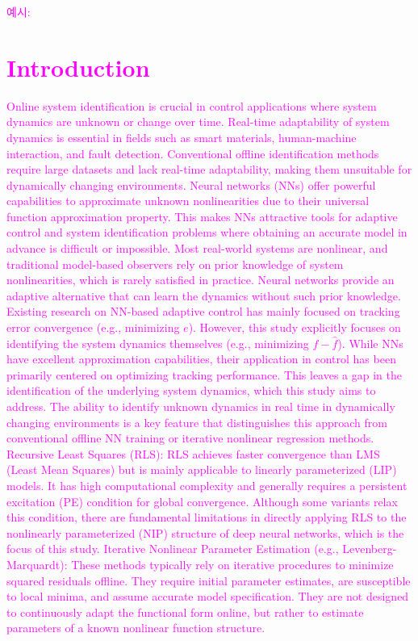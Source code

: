 \documentclass[10pt,twocolumn]{ICCAS}
\newcommand{\DHHO}[1]{\textcolor{magenta}{#1}}
\begin{document}
\DHHO{예시:
    \section{Introduction}
    Online system identification is crucial in control applications where system dynamics are unknown or change over time. Real-time adaptability of system dynamics is essential in fields such as smart materials, human-machine interaction, and fault detection. Conventional offline identification methods require large datasets and lack real-time adaptability, making them unsuitable for dynamically changing environments.
    Neural networks (NNs) offer powerful capabilities to approximate unknown nonlinearities due to their universal function approximation property. This makes NNs attractive tools for adaptive control and system identification problems where obtaining an accurate model in advance is difficult or impossible.
    Most real-world systems are nonlinear, and traditional model-based observers rely on prior knowledge of system nonlinearities, which is rarely satisfied in practice. Neural networks provide an adaptive alternative that can learn the dynamics without such prior knowledge.
    Existing research on NN-based adaptive control has mainly focused on tracking error convergence (e.g., minimizing $e$). However, this study explicitly focuses on identifying the system dynamics themselves (e.g., minimizing $f - \hat{f}$). While NNs have excellent approximation capabilities, their application in control has been primarily centered on optimizing tracking performance. This leaves a gap in the identification of the underlying system dynamics, which this study aims to address. The ability to identify unknown dynamics in real time in dynamically changing environments is a key feature that distinguishes this approach from conventional offline NN training or iterative nonlinear regression methods.
    Recursive Least Squares (RLS): RLS achieves faster convergence than LMS (Least Mean Squares) but is mainly applicable to linearly parameterized (LIP) models. It has high computational complexity and generally requires a persistent excitation (PE) condition for global convergence. Although some variants relax this condition, there are fundamental limitations in directly applying RLS to the nonlinearly parameterized (NIP) structure of deep neural networks, which is the focus of this study.
    Iterative Nonlinear Parameter Estimation (e.g., Levenberg-Marquardt): These methods typically rely on iterative procedures to minimize squared residuals offline. They require initial parameter estimates, are susceptible to local minima, and assume accurate model specification. They are not designed to continuously adapt the functional form online, but rather to estimate parameters of a known nonlinear function structure.
}
\end{document}
